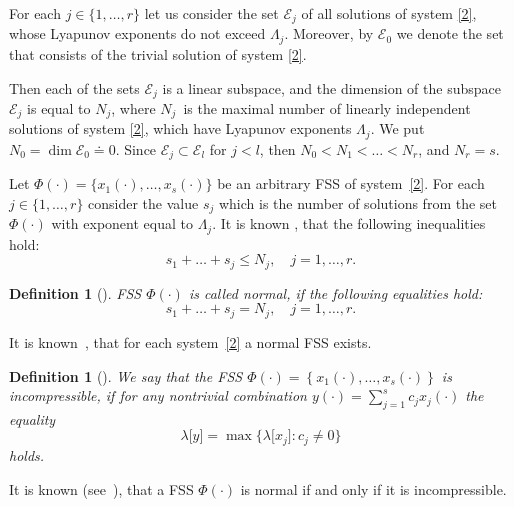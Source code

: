 \documentclass[11pt]{article}
\newtheorem{definition}[theorem]{Definition}
\begin{document}
For each $j\in \{1,\dots ,r\}$ let us consider the set $\mathcal{E}_{j}$ of
all solutions of system \eqref{2}, whose Lyapunov exponents do not exceed $%
\Lambda _{j}$. Moreover, by $\mathcal{E}_{0}$ we denote the set that
consists of the trivial solution of system \eqref{2}.

Then \cite[p.\,54]{GAI} each of the sets $\mathcal{E}_{j}$ is a linear
subspace, and the dimension of the subspace $\mathcal{E}_{j}$ is equal to $%
N_{j}$, where $N_{j}$~is the maximal number of linearly independent solutions of
system \eqref{2}, which have Lyapunov exponents $\Lambda _{j}$. We put 
$N_{0}=\dim \mathcal{E}_{0}\doteq 0$. Since 
$\mathcal{E}_{j}\subset \mathcal{E}_{l}$ for $j<l$, then $N_{0}<N_{1}<\ldots <N_{r}$, and $N_{r}=s$.

Let $\Phi (\cdot )=\bigl\{x_{1}(\cdot ),\ldots ,x_{s}(\cdot )\bigr\}$ be an
arbitrary FSS of system~\eqref{2}. For each $j\in \{1,\dots ,r\}$ consider
the value $s_{j}$ which is the number of solutions from the set $\Phi (\cdot
)$ with exponent equal to $\Lambda _{j}$. It is known \cite[p.\,54]{GAI},
that the following inequalities 
hold:
\begin{equation*}
s_{1}+\ldots +s_{j}\le N_{j},\quad j=1,\dots ,r.
\end{equation*}%

\begin{definition}[{\protect\cite[p.\,53]{GAI}}]
\label{normal}FSS $\Phi (\cdot )$ is called \emph{normal}, if the
following equalities hold:
\begin{equation*}
s_{1}+\ldots +s_{j}=N_{j},\quad j=1,\dots ,r.
\end{equation*}%
\end{definition}

It is known~\cite[p.\,55]{GAI}, that for each system~\eqref{2} a normal FSS
exists.

\begin{definition}[{\protect\cite[p.\,55]{GAI}}]
\label{neszhim}We say that the FSS $\Phi (\cdot )=\left\{ x_{1}( \cdot
) ,\ldots ,x_{s}( \cdot ) \right\} $ is \emph{%
incompressible}, if for any nontrivial combination $y(\cdot
)=\sum\limits_{j=1}^{s}c_{j}x_{j}(\cdot )$ the
equality
\begin{equation*}
\lambda \lbrack y]=\max \bigl\{\lambda \lbrack x_{j}]\colon c_{j}\neq 0%
\bigr\}
\end{equation*}%
holds.
\end{definition}

It is known (see~\cite[p.\,55]{GAI}), that a FSS $\Phi (\cdot )$ is normal
if and only if it is incompressible.
\end{document}
